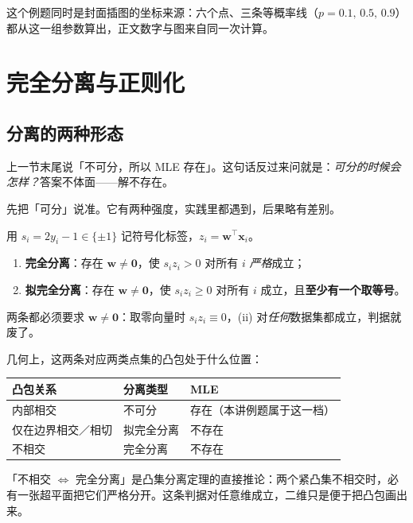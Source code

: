 \documentclass[11pt,a4paper,fontset=windows,zihao=-4]{ctexart}
\newcommand{\bw}{\mathbf{w}}
\newcommand{\bx}{\mathbf{x}}
\newcommand{\bzero}{\mathbf{0}}
\newcommand{\tp}{^{\top}}
\newcommand{\tabhead}{\sffamily\bfseries\color{navy}}
\begin{document}
这个例题同时是封面插图的坐标来源：六个点、三条等概率线（$p=0.1,\,0.5,\,0.9$）都从这一组参数算出，正文数字与图来自同一次计算。

\section{完全分离与正则化}

\subsection{分离的两种形态}

上一节末尾说「不可分，所以 MLE 存在」。这句话反过来问就是：\emph{可分的时候会怎样？}答案不体面——解不存在。

先把「可分」说准。它有两种强度，实践里都遇到，后果略有差别。

\begin{dfn}[完全分离与拟完全分离]
用 $s_i=2y_i-1\in\{\pm1\}$ 记符号化标签，$z_i=\bw\tp\bx_i$。
\begin{enumerate}[label=(\roman*),leftmargin=2.2em]
  \item \textbf{完全分离}：存在 $\bw\ne\bzero$，使 $s_i z_i>0$ 对所有 $i$ \emph{严格}成立；
  \item \textbf{拟完全分离}：存在 $\bw\ne\bzero$，使 $s_i z_i\ge0$ 对所有 $i$ 成立，且\textbf{至少有一个取等号}。
\end{enumerate}
两条都必须要求 $\bw\ne\bzero$：取零向量时 $s_iz_i\equiv0$，(ii) 对\emph{任何}数据集都成立，判据就废了。
\end{dfn}

几何上，这两条对应两类点集的凸包处于什么位置：

\begin{center}
\small
\begin{tabular}{@{}lll@{}}
\toprule
\rowcolor{navy!7}
\tabhead 凸包关系 & \tabhead 分离类型 & \tabhead MLE\\
\midrule
内部相交 & 不可分 & 存在（本讲例题属于这一档）\\
仅在边界相交／相切 & 拟完全分离 & 不存在\\
不相交 & 完全分离 & 不存在\\
\bottomrule
\end{tabular}
\end{center}

「不相交 $\iff$ 完全分离」是凸集分离定理的直接推论：两个紧凸集不相交时，必有一张超平面把它们严格分开。这条判据对任意维成立，二维只是便于把凸包画出来。
\end{document}
